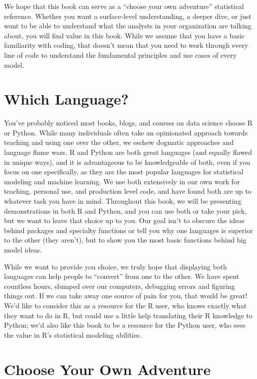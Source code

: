 \documentclass[
  letterpaper,
]{krantz}
\begin{document}
We hope that this book can serve as a ``choose your own adventure''
statistical reference. Whether you want a surface-level understanding, a
deeper dive, or just want to be able to understand what the analysts in
your organization are talking about, you will find value in this book.
While we assume that you have a basic familiarity with coding, that
doesn't mean that you need to work through every line of code to
understand the fundamental principles and use cases of every model.

\section{Which Language?}\label{which-language}

You've probably noticed most books, blogs, and courses on data science
choose R or Python. While many individuals often take an opinionated
approach towards teaching and using one over the other, we eschew
dogmatic approaches and language flame wars. R and Python are both great
languages (and equally flawed in unique ways), and it is advantageous to
be knowledgeable of both, even if you focus on one specifically, as they
are the most popular languages for statistical modeling and machine
learning. We use both extensively in our own work for teaching, personal
use, and production level code, and have found both are up to whatever
task you have in mind. Throughout this book, we will be presenting
demonstrations in both R and Python, and you can use both or take your
pick, but we want to leave that choice up to you. Our goal isn't to
obscure the ideas behind packages and specialty functions or tell you
why one languages is superior to the other (they aren't), but to show
you the most basic functions behind big model ideas.

While we want to provide you choice, we truly hope that displaying both
languages can help people to ``convert'' from one to the other. We have
spent countless hours, slumped over our computers, debugging errors and
figuring things out. If we can take away one source of pain for you,
that would be great! We'd like to consider this as a resource for the R
user, who knows exactly what they want to do in R, but could use a
little help translating their R knowledge to Python; we'd also like this
book to be a resource for the Python user, who sees the value in R's
statistical modeling abilities.

\section{Choose Your Own Adventure}\label{choose-your-own-adventure}
\end{document}
